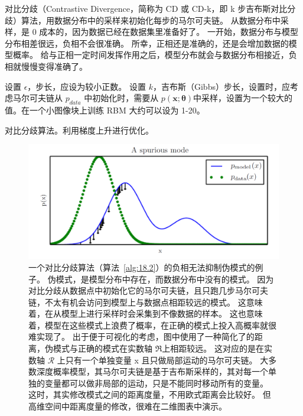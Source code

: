 对比分歧（Contrastive Divergence，简称为 CD 或 CD-k，即 k 步吉布斯对比分歧）算法，用数据分布中的采样来初始化每步的马尔可夫链。
从数据分布中采样，是 0 成本的，因为数据已经在数据集里准备好了。
一开始，数据分布与模型分布相差很远，负相不会很准确。
所幸，正相还是准确的，还是会增加数据的模型概率。
给与正相一定时间发挥作用之后，模型分布就会与数据分布相接近，负相就慢慢变得准确了。

\begin{algorithm}
\DontPrintSemicolon
设置 \(\epsilon\)，步长，应设为较小正数。\;
设置 \(k\)，吉布斯（Gibbs）步长，设置时，应考虑马尔可夫链从 \(p_{data}\) 中初始化时，需要从 \(p(\bm{x};\bm{\theta})\)中采样，设置为一个较大的值。在一个小图像块上训练 RBM 大约可以设为 1-20。\;
\caption{对比分歧算法。利用梯度上升进行优化。\label{alg:18.2}}
\end{algorithm}

\begin{figure}[htbp] %
   \centering
   \includegraphics[width=\textwidth]{fig/chap18/18_2.png} 
   \caption{一个对比分歧算法（算法~\ref{alg:18.2}）的负相无法抑制伪模式的例子。
   伪模式，是模型分布中存在，而数据分布中没有的模式。
   因为对比分歧从数据点中初始化它的马尔可夫链，且只跑几步马尔可夫链，不太有机会访问到模型上与数据点相距较远的模式。
   这意味着，在从模型上进行采样时会采集到不像数据的样本。
   这也意味着，模型在这些模式上浪费了概率，在正确的模式上投入高概率就很难实现了。
   出于便于可视化的考虑，图中使用了一种简化了的距离，伪模式与正确的模式在实数轴 \(\mathfrak{R}\)上相距较远。
   这对应的是在实数轴 \(\mathcal{R} \) 上只有一个单独变量 x 且只做局部运动的马尔可夫链。
   大多数深度概率模型，其马尔可夫链是基于吉布斯采样的，其对每一个单独的变量都可以做非局部的运动，只是不能同时移动所有的变量。
   这时，其实修改模式之间的距离度量，不用欧式距离会比较好。
   但高维空间中距离度量的修改，很难在二维图表中演示。}
   \label{fig:18.2}
\end{figure}

